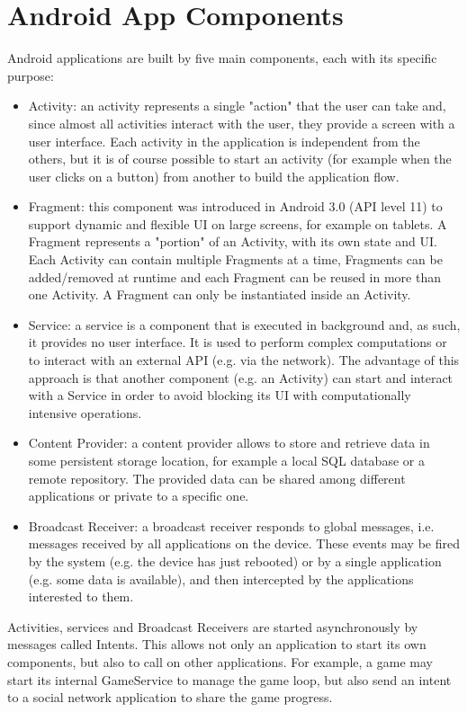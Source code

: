 \documentclass[11pt,a4paper,notitlepage]{article}
\begin{document}
\section{Android App Components}
Android applications are built by five main components, each with its specific purpose:
\begin{itemize}
	\item Activity: an activity represents a single "action" that the user can take and, since almost all activities interact with the user, they provide a screen with a user interface. Each activity in the application is independent from the others, but it is of course possible to start an activity (for example when the user clicks on a button) from another to build the application flow.
	\item Fragment: this component was introduced in Android 3.0 (API level 11) to support dynamic and flexible UI on large screens, for example on tablets. A Fragment  represents a "portion" of an Activity, with its own state and UI. Each Activity can contain multiple Fragments at a time, Fragments can be added/removed at runtime and each Fragment can be reused in more than one Activity. A Fragment can only be instantiated inside an Activity.
	\item Service: a service is a component that is executed in background and, as such, it provides no user interface. It is used to perform complex computations or to interact with an external API (e.g. via the network). The advantage of this approach is that another component (e.g. an Activity) can start and interact with a Service in order to avoid blocking its UI with computationally intensive operations.
	\item Content Provider: a content provider allows to store and retrieve data in some persistent storage location, for example a local SQL database or a remote repository. The provided data can be shared among different applications or private to a specific one.
	\item Broadcast Receiver: a broadcast receiver responds to global messages, i.e. messages received by all applications on the device. These events may be fired by the system (e.g. the device has just rebooted) or by a single application (e.g. some data is available), and then intercepted by the applications interested to them.
\end{itemize} 
Activities, services and Broadcast Receivers are started asynchronously by messages called Intents. This allows not only an application to start its own components, but also to call on other applications. For example, a game may start its internal GameService to manage the game loop, but also send an intent to a social network application to share the game progress.
\end{document}
